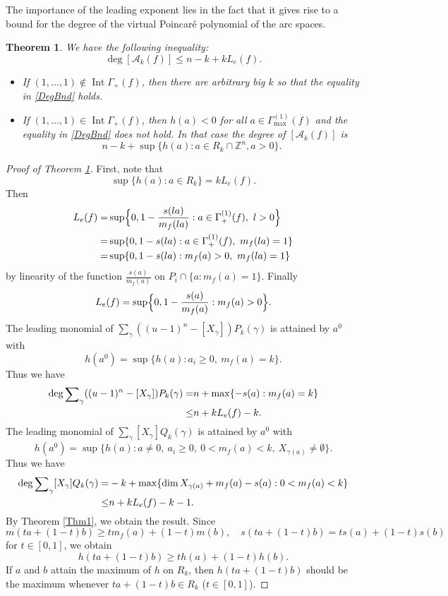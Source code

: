 \documentclass[12pt,a4paper,leqno]{amsart}
\newtheorem{thm}{Theorem}[section]
\theoremstyle{definition}
\begin{document}
The importance of the leading exponent lies in the fact that it gives rise to a bound for the degree of the
virtual Poincar\'e polynomial of the arc spaces.

\begin{thm}\label{ThDegBnd}
We have the following inequality:
\begin{equation}\label{DegBnd}
\deg[\mathcal A_k(f)]\le n-k+k L_e(f).
\end{equation}
\begin{itemize}
\item If $(1,\dots,1)\not\in{\mathop{\mathrm{Int}}\nolimits}\Gamma_+(f)$,  
then there are arbitrary big $k$ so that 
the equality in \eqref{DegBnd} holds. 
\item 
If $(1,\dots,1)\in{\mathop{\mathrm{Int}}\nolimits}\Gamma_+(f)$, 
then $h(a)<0$ for all $a\in\Gamma^{(1)}_{\max}(f)$ and 
the equality in \eqref{DegBnd}
does not hold. In that case the degree of $[\mathcal A_k(f)]$ is 
$$
n-k+\sup\{h(a):a\in R_k\cap{\mathbb{Z}}^n, a>0\}.
$$
\end{itemize}
\end{thm}

\begin{proof}[Proof of Theorem \ref{ThDegBnd}]
First, note that 
$$
\sup\{h(a):a\in R_k\}=k L_e(f).
$$
Then
\begin{align*}
L_e(f)
=&\sup\Bigl\{0,1-\frac{s(la)}{m_f(la)}:a\in\Gamma_+^{(1)}(f),\ l>0\Bigr\}\\ 
=&\sup\{0,1-s(la):a\in\Gamma_+^{(1)}(f),\ m_f(la)=1\}\\ 
=&\sup\{0,1-s(la):m_f(a)>0,\ m_f(la)=1\}
\end{align*}
by linearity of the function $\frac{s(a)}{m_f(a)}$ on 
$P_i\cap\{a:m_f(a)=1\}$. Finally
$$
L_e(f)
=\sup\Bigl\{0,1-\frac{s(a)}{m_f(a)}:m_f(a)>0\Bigr\}.
$$
The leading monomial of 
$\sum_\gamma((u-1)^n-[X_\gamma])P_k(\gamma)$ 
is attained by {$a^0$} with 
$$
h(\textrm{{$a^0$}})=\sup\{h(a):a_i\ge0,\ m_f(a)=k\}.
$$
Thus we have 
\begin{align*}
\deg{\mathop{\textrm{\scriptsize $\mathop\sum$}}}_\gamma((u-1)^n-[X_\gamma])P_k(\gamma)
=&n+\max\{-s(a):m_f(a)=k\}\\
\le&n+kL_e(f)-k.
\end{align*} 
The leading monomial of $\sum_\gamma [X_\gamma]
Q_k(\gamma)$ is attained by {$a^0$} with 
$$
h(\textrm{{$a^0$}})
=\sup\{h(a):a\ne0,\ a_i\ge0, \ 0<m_f(a)<k,\ X_{\gamma(a)}\ne\emptyset\}.
$$
Thus we have 
\begin{align*}
\deg{\mathop{\textrm{\scriptsize $\mathop\sum$}}}_\gamma[X_\gamma]Q_k(\gamma)
=&-k+\max\{\dim X_{\gamma(a)}+m_f(a)-s(a):0<m_f(a)<k\}\\
\le&n+kL_e(f)-k-1.
\end{align*} 
By Theorem \ref{Thm1}, 
we obtain the result. 
Since 
$$m(ta+(1-t)b)\ge tm_f(a)+(1-t)m(b),\quad 
s(ta+(1-t)b)=ts(a)+(1-t)s(b)
$$
for $t\in[0,1]$, we obtain 
$$
h(ta+(1-t)b)\ge th(a)+(1-t)h(b). 
$$
If $a$ and $b$ attain {the} maximum of $h$ on $R_k$, 
then $h(ta+(1-t)b)$ should be the maximum whenever $ta+(1-t)b\in R_k$
($t\in[0,1]$).
\end{proof}
\end{document}
